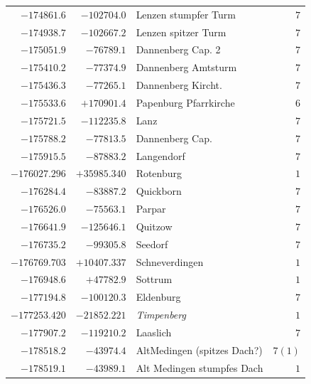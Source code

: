 \begin{center}
\begin{tabular}{r|r|p{170pt}|r}
\(-174861.6\)&\(-102704.0\)&Lenzen stumpfer Turm&\(7\)\\
\(-174938.7\)&\(-102667.2\)&Lenzen spitzer Turm&\(7\)\\
\(-175051.9\)&\(-76789.1\)&Dannenberg Cap. 2&\(7\)\\
\(-175410.2\)&\(-77374.9\)&Dannenberg Amtsturm&\(7\)\\
\(-175436.3\)&\(-77265.1\)&Dannenberg Kircht.&\(7\)\\
\(-175533.6\)&\(+170901.4\)&Papenburg Pfarrkirche&\(6\)\\
\(-175721.5\)&\(-112235.8\)&Lanz&\(7\)\\
\(-175788.2\)&\(-77813.5\)&Dannenberg Cap.&\(7\)\\
\(-175915.5\)&\(-87883.2\)&Langendorf&\(7\)\\
\(-176027.296\)&\(+35985.340\)&Rotenburg&\(1\)\\
\(-176284.4\)&\(-83887.2\)&Quickborn&\(7\)\\
\(-176526.0\)&\(-75563.1\)&Parpar&\(7\)\\
\(-176641.9\)&\(-125646.1\)&Quitzow&\(7\)\\
\(-176735.2\)&\(-99305.8\)&Seedorf&\(7\)\\
\(-176769.703\)&\(+10407.337\)&Schneverdingen&\(1\)\\
\(-176948.6\)&\(+47782.9\)&Sottrum&\(1\)\\
\(-177194.8\)&\(-100120.3\)&Eldenburg&\(7\)\\
\(-177253.420\)&\(-21852.221\)&\textit{Timpenberg}&\(1\)\\
\(-177907.2\)&\(-119210.2\)&Laaslich&\(7\)\\
\(-178518.2\)&\(-43974.4\)&AltMedingen (spitzes Dach?)&\(7 (1)\)\\
\(-178519.1\)&\(-43989.1\)&Alt Medingen stumpfes Dach&\(1\)\\
\hline\end{tabular}\endgroup\end{center}
